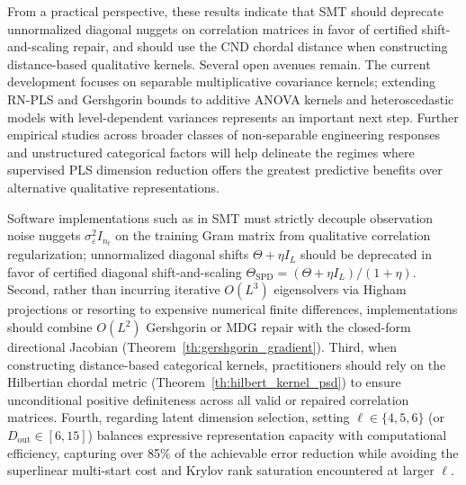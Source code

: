 \documentclass[default,sn-mathphys,Numbered]{sn-jnl}
\theoremstyle{thmstyleone}
\theoremstyle{thmstylethree}
\theoremstyle{thmstyletwo}
\newcommand{\outp}{\text{out}}
\begin{document}
From a practical perspective, these results indicate that SMT should deprecate unnormalized diagonal nuggets on correlation matrices in favor of certified shift-and-scaling repair, and should use the CND chordal distance when constructing distance-based qualitative kernels. Several open avenues remain. The current development focuses on separable multiplicative covariance kernels; extending RN-PLS and Gershgorin bounds to additive ANOVA kernels and heteroscedastic models with level-dependent variances represents an important next step. Further empirical studies across broader classes of non-separable engineering responses and unstructured categorical factors will help delineate the regimes where supervised PLS dimension reduction offers the greatest predictive benefits over alternative qualitative representations.

Software implementations such as in SMT must strictly decouple observation noise nuggets $\sigma_\varepsilon^2 I_{n_t}$ on the training Gram matrix from qualitative correlation regularization; unnormalized diagonal shifts $\Theta + \eta I_L$ should be deprecated in favor of certified diagonal shift-and-scaling $\Theta_{\mathrm{SPD}} = (\Theta + \eta I_L)/(1+\eta)$. Second, rather than incurring iterative $O(L^3)$ eigensolvers via Higham projections or resorting to expensive numerical finite differences, implementations should combine $O(L^2)$ Gershgorin or MDG repair with the closed-form directional Jacobian (Theorem~\ref{th:gershgorin_gradient}). Third, when constructing distance-based categorical kernels, practitioners should rely on the Hilbertian chordal metric (Theorem~\ref{th:hilbert_kernel_psd}) to ensure unconditional positive definiteness across all valid or repaired correlation matrices. Fourth, regarding latent dimension selection, setting $\ell \in \{4, 5, 6\}$ (or $D_{\outp} \in [6, 15]$) balances expressive representation capacity with computational efficiency, capturing over 85\% of the achievable error reduction while avoiding the superlinear multi-start cost and Krylov rank saturation encountered at larger $\ell$.
\end{document}

